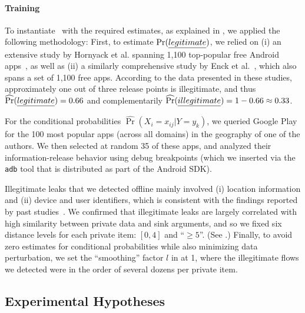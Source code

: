 \paragraph{Training} To instantiate \Tool\ with the required estimates, as explained in , we applied the following methodology:
%
First, to estimate $\Pr(\emph{legitimate})$, we relied on (i) an extensive study by Hornyack et al. spanning 1,100 top-popular free Android apps~\cite{HHJSW:CCS11}, as well as (ii) a similarly comprehensive study by Enck et al.~\cite{EOMC:SEC11}, which also spans a set of 1,100 free apps. According to the data presented in these studies, approximately one out of three release points is illegitimate, and thus $\widehat{\Pr}(\emph{legitimate})=0.66$ and complementarily
$\widehat{\Pr}(\emph{illegitimate}) = 1-0.66 \approx 0.33$.

For the conditional probabilities $\widehat{\Pr}(X_i = x_{ij} | Y=y_k)$,  we queried Google Play for the 100 most popular apps (across all domains) in the geography of one of the authors. We then selected at random 35 of these apps, and analyzed their information-release behavior using debug breakpoints
(which we inserted via the {\tt adb} tool that is distributed as part of the Android SDK).

Illegitimate leaks that we detected offline mainly involved (i) location information and (ii) device and user identifiers, which is consistent with the findings reported by past studies~\cite{HHJSW:CCS11,EOMC:SEC11}. We confirmed that illegitimate leaks are largely correlated with high similarity between private data and sink arguments, and so we fixed six distance levels for each private item: $[0,4]$ and ``$\geq 5$''. (See .) Finally, to avoid zero estimates for conditional probabilities while also minimizing data perturbation, we set the ``smoothing'' factor $l$ in  at 1, where the illegitimate flows we detected were in the order of several dozens per private item.

\subsection{Experimental Hypotheses}


